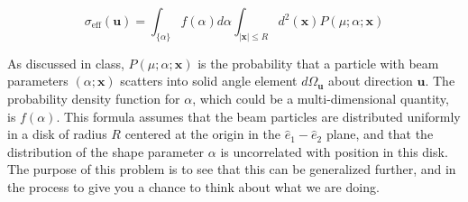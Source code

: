 \documentclass[12pt]{article}
\begin{document}
\begin{equation*}
\sigma_{\mathrm{eff}}(\mathbf{u})=\int_{\{\alpha\}} f(\alpha) d \alpha \int_{|\mathbf{x}| \leq R} d^{2}(\mathbf{x}) P(\mu ; \alpha ; \mathbf{x}) \tag{3}
\end{equation*}


As discussed in class, $P(\mu ; \alpha ; \mathbf{x})$ is the probability that a particle with beam parameters $(\alpha ; \mathbf{x})$ scatters into solid angle element $d \Omega_{\mathbf{u}}$ about direction $\mathbf{u}$. The probability density function for $\alpha$, which could be a multi-dimensional quantity, is $f(\alpha)$. This formula assumes that the beam particles are distributed uniformly in a disk of radius $R$ centered at the origin in the $\hat{e}_{1}-\hat{e}_{2}$ plane, and that the distribution of the shape parameter $\alpha$ is uncorrelated with position in this disk. The purpose of this problem is to see that this can be generalized further, and in the process to give you a chance to think about what we are doing.
\end{document}
